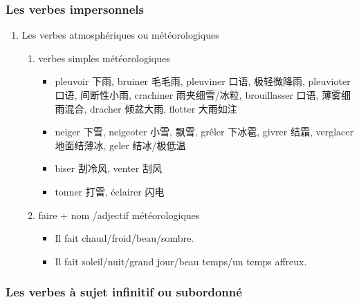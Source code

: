\documentclass[UTF8]{report}
\begin{document}
\subsubsection{Les verbes impersonnels}
\begin{enumerate}
    \item Les verbes atmosphériques ou météorologiques
    \begin{enumerate}
        \item verbes simples météorologiques
        \begin{itemize}
            \item pleuvoir 下雨, bruiner 毛毛雨, pleuviner 口语, 极轻微降雨, pleuvioter 口语, 间断性小雨, crachiner 雨夹细雪/冰粒, brouillasser 口语, 薄雾细雨混合, dracher 倾盆大雨, flotter 大雨如注
            \item neiger 下雪, neigeoter 小雪, 飘雪, grêler 下冰雹, givrer 结霜, verglacer 地面结薄冰, geler 结冰/极低温
            \item biser 刮冷风, venter 刮风
            \item tonner 打雷, éclairer 闪电
        \end{itemize}
        \item faire + nom /adjectif météorologiques
        \begin{itemize}
            \item Il fait chaud/froid/beau/sombre.
            \item Il fait soleil/nuit/grand jour/beau temps/un temps affreux.
        \end{itemize}
    \end{enumerate}
\end{enumerate}

\subsubsection{Les verbes à sujet infinitif ou subordonné}
\end{document}
